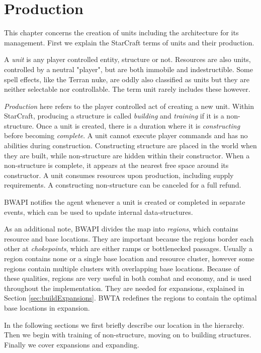 \chapter{Production}
\label{ch:production}
This chapter concerns the creation of units including the architecture for its management. First we explain the StarCraft terms of units and their production.

A \emph{unit} is any player controlled entity, structure or not. Resources are also units, controlled by a neutral "player", but are both immobile and indestructible. Some spell effects, like the Terran nuke, are oddly also classified as units but they are neither selectable nor controllable. The term unit rarely includes these however.

\emph{Production} here refers to the player controlled act of creating a new unit. Within StarCraft, producing a structure is called \emph{building} and \emph{training} if it is a non-structure. Once a unit is created, there is a duration where it is \emph{constructing} before becoming \emph{complete}. A unit cannot execute player commands and has no abilities during construction. Constructing structure are placed in the world when they are built, while non-structure are hidden within their constructor. When a non-structure is complete, it appears at the nearest free space around its constructor. A unit consumes resources upon production, including supply requirements. A constructing non-structure can be canceled for a full refund.

BWAPI notifies the agent whenever a unit is created or completed in separate events, which can be used to update internal data-structures.

As an additional note, BWAPI divides the map into \emph{regions}, which contains resource and base locations. They are important because the regions border each other at \emph{chokepoints}, which are either ramps or bottlenecked passages. Usually a region contains none or a single base location and resource cluster, however some regions contain multiple clusters with overlapping base locations. Because of these qualities, regions are very useful in both combat and economy, and is used throughout the implementation. They are needed for expansions, explained in Section \ref{sec:buildExpansions}. BWTA redefines the regions to contain the optimal base locations in expansion.

In the following sections we first briefly describe our location in the hierarchy. Then we begin with training of non-structure, moving on to building structures. Finally we cover expansions and expanding.


